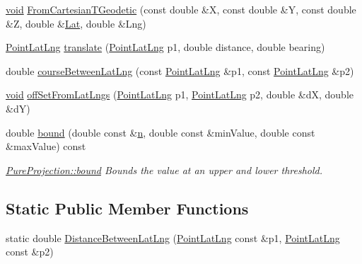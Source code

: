 \begin{DoxyCompactItemize}
\hyperlink{group___u_a_v_objects_plugin_ga444cf2ff3f0ecbe028adce838d373f5c}{void} \hyperlink{group___o_p_map_widget_ga872656fbcb1b34b5888a600e4782db13}{\-From\-Cartesian\-T\-Geodetic} (const double \&\-X, const double \&\-Y, const double \&\-Z, double \&\hyperlink{_o_p_plots_8m_afdc4c4bc9859d268f8b5d1cc44b8ab7c}{\-Lat}, double \&\-Lng)
\item 
\hyperlink{structinternals_1_1_point_lat_lng}{\-Point\-Lat\-Lng} \hyperlink{group___o_p_map_widget_gae41a7a74d45f66fa61c622f0838827ae}{translate} (\hyperlink{structinternals_1_1_point_lat_lng}{\-Point\-Lat\-Lng} p1, double distance, double bearing)
\item 
double \hyperlink{group___o_p_map_widget_ga2b6a72edc701752748d62a513aea828b}{course\-Between\-Lat\-Lng} (const \hyperlink{structinternals_1_1_point_lat_lng}{\-Point\-Lat\-Lng} \&p1, const \hyperlink{structinternals_1_1_point_lat_lng}{\-Point\-Lat\-Lng} \&p2)
\item 
\hyperlink{group___u_a_v_objects_plugin_ga444cf2ff3f0ecbe028adce838d373f5c}{void} \hyperlink{group___o_p_map_widget_gaa4efe3b7598311215c44e7a0f47df531}{off\-Set\-From\-Lat\-Lngs} (\hyperlink{structinternals_1_1_point_lat_lng}{\-Point\-Lat\-Lng} p1, \hyperlink{structinternals_1_1_point_lat_lng}{\-Point\-Lat\-Lng} p2, double \&d\-X, double \&d\-Y)
\item 
double \hyperlink{group___o_p_map_widget_ga0a978f088a3c28b59ce7bdf4ac3ab238}{bound} (double const \&\hyperlink{_o_p_plots_8m_a1ee0621678c54afffb4b6e50f10c9ab8}{n}, double const \&min\-Value, double const \&max\-Value) const 
\begin{DoxyCompactList}\small\item\em \hyperlink{group___o_p_map_widget_ga0a978f088a3c28b59ce7bdf4ac3ab238}{\-Pure\-Projection\-::bound} \-Bounds the value at an upper and lower threshold. \end{DoxyCompactList}\end{DoxyCompactItemize}
\subsection*{\-Static \-Public \-Member \-Functions}
\begin{DoxyCompactItemize}
\item 
static double \hyperlink{group___o_p_map_widget_ga2dd7d98a1173081e9e81f2acb088f382}{\-Distance\-Between\-Lat\-Lng} (\hyperlink{structinternals_1_1_point_lat_lng}{\-Point\-Lat\-Lng} const \&p1, \hyperlink{structinternals_1_1_point_lat_lng}{\-Point\-Lat\-Lng} const \&p2)
\end{DoxyCompactItemize}
